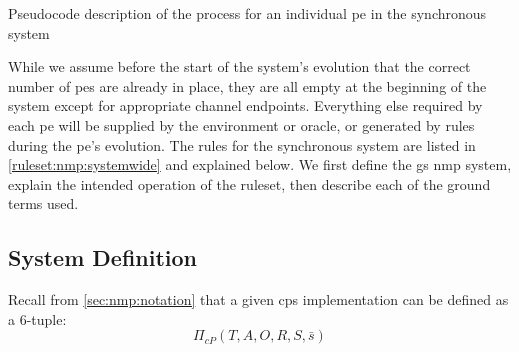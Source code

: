 \begin{algorithm}
\DontPrintSemicolon
{}
\caption[Pseudocode of the \acrlong{nmp} process in the synchronous system]{\label{alg:nmp:systemwide2}Pseudocode description of the process for an individual \gls{pe} in the synchronous system}
\end{algorithm}

While we assume before the start of the system's evolution that the correct number of \glspl{pe} are already in place, they are all empty at the beginning of the system except for appropriate channel endpoints.  Everything else required by each \gls{pe} will be supplied by the environment or oracle, or generated by rules during the \gls{pe}'s evolution.  The rules for the synchronous system are listed in \autoref{ruleset:nmp:systemwide} and explained below.  We first define the \gls{gs} \gls{nmp} system, explain the intended operation of the ruleset, then describe each of the ground terms used.

\subsection{System Definition}
Recall from \autoref{sec:nmp:notation} that a given \gls{cps} implementation can be defined as a 6-tuple:
\[
\Pi_{cP}(T, A, O, R, S, \bar{s})
\]


